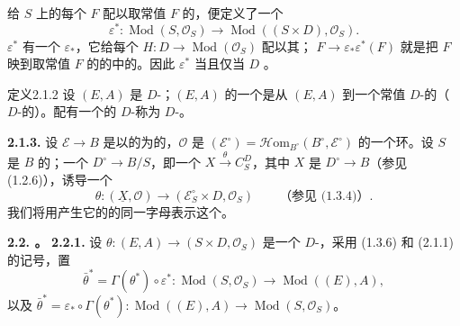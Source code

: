 给 $S$ 上的每个 $F$ 配以取常值 $F$ 的，便定义了一个
\[
\varepsilon^*:\operatorname{Mod}(S,\mathcal O_S)\longrightarrow\operatorname{Mod}((S\times D),\mathcal O_S).
\]
 $\varepsilon^*$ 有一个 $\varepsilon_*$，它给每个 $H:D\to\operatorname{Mod}(\mathcal O_S)$ 配以其； $F\to\varepsilon_*\varepsilon^*(F)$ 就是把 $F$ 映到取常值 $F$ 的的中的。因此 $\varepsilon^*$ 当且仅当 $D$ 。

\begin{SGAresult}{定义}{2.1.2}
设 $(E,A)$ 是 $D$-；$(E,A)$ 的一个是从 $(E,A)$ 到一个常值 $D$-的（ $D$-的）。配有一个的 $D$-称为 $D$-。
\end{SGAresult}
\textbf{2.1.3.} 设 $\mathscr E\to B$ 是以的为的，$\mathcal O$ 是 $(\mathscr E^\circ)=\mathscr{H}\mathrm{om}_{B^\circ}(B^\circ,\mathscr E^\circ)$ 的一个环。设 $S$ 是 $B$ 的；一个 $D^\circ\to B/S$，即一个 $X\xrightarrow{\theta}C_S^D$，其中 $X$ 是 $D^\circ\to B$（参见 (1.2.6)），诱导一个
\[
\theta:(\underline X,\mathcal O)\longrightarrow(\mathscr E_S^\circ\times D,\mathcal O_S)
\qquad\text{（参见 (1.3.4)）}.
\]
我们将用产生它的的同一字母表示这个。

\textbf{2.2. 。}
\textbf{2.2.1.} 设 $\theta:(E,A)\to(S\times D,\mathcal O_S)$ 是一个 $D$-，采用 (1.3.6) 和 (2.1.1) 的记号，置
\[
\bar\theta^*=\Gamma(\theta^*)\circ\varepsilon^*:
\operatorname{Mod}(S,\mathcal O_S)\longrightarrow\operatorname{Mod}((E),A),
\]
以及 $\bar\theta^*=\varepsilon_*\circ\Gamma(\theta^*):\operatorname{Mod}((E),A)\to\operatorname{Mod}(S,\mathcal O_S)$。

